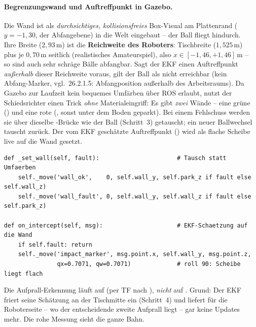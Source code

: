 \paragraph{Begrenzungswand und Auftreffpunkt in Gazebo.} Die Wand ist als
\emph{durchsichtiges, kollisionsfreies} Box-Visual am Plattenrand ($y=-1{,}30$,
der Abfangebene) in die Welt eingebaut -- der Ball fliegt hindurch. Ihre Breite
($2{,}93\,$m) ist die \textbf{Reichweite des Roboters}: Tischbreite ($1{,}525\,$m)
plus je $0{,}70\,$m seitlich (realistisches Amateurspiel), also $x\in[-1{,}46,
+1{,}46]\,$m -- so sind auch sehr schräge Bälle abfangbar. Sagt der EKF einen
Auftreffpunkt \emph{außerhalb} dieser Reichweite voraus, gilt der Ball als nicht
erreichbar (kein Abfang-Marker, vgl.\ 26.2.1.5: Abfangposition außerhalb des
Arbeitsraums). Da Gazebo zur
Laufzeit kein bequemes Umfärben über ROS erlaubt, nutzt der Schiedsrichter einen
Trick \emph{ohne} Materialeingriff: Es gibt \emph{zwei} Wände -- eine grüne
() und eine rote (, sonst unter dem Boden
geparkt). Bei einem Fehlschuss werden sie über dieselbe -Brücke
wie der Ball (Schritt~3) getauscht; ein neuer Ballwechsel tauscht zurück. Der vom
EKF geschätzte Auftreffpunkt () wird als flache Scheibe live
auf die Wand gesetzt.
\begin{lstlisting}[style=py,caption={\code{match\_referee} -- Wand umfärben \& Auftreffpunkt setzen (set\_pose)}]
def _set_wall(self, fault):                      # Tausch statt Umfaerben
    self._move('wall_ok',    0, self.wall_y, self.park_z if fault else self.wall_z)
    self._move('wall_fault', 0, self.wall_y, self.wall_z if fault else self.park_z)

def on_intercept(self, msg):                     # EKF-Schaetzung auf die Wand
    if self.fault: return
    self._move('impact_marker', msg.point.x, self.wall_y, msg.point.z,
               qx=0.7071, qw=0.7071)             # roll 90: Scheibe liegt flach
\end{lstlisting}

\begin{warnbox}[title={Schiedsrichter liest Messungen, nicht die EKF-Schätzung}]
Die Aufprall-Erkennung läuft auf  (per TF nach ),
\emph{nicht} auf . Grund: Der EKF friert seine Schätzung an
der Tischmitte ein (Schritt~4) und liefert für die Roboterseite -- wo der
entscheidende zweite Aufprall liegt -- gar keine Updates mehr. Die rohe Messung
sieht die ganze Bahn.
\end{warnbox}

